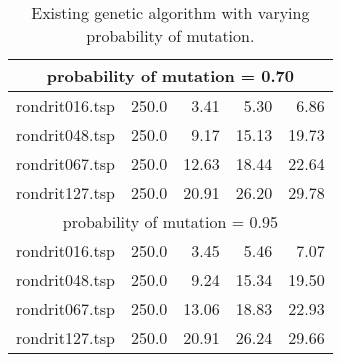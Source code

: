 \begin{table}[H]
{\begin{tabular}{l rrrr}
\multicolumn{5}{c}{probability of mutation = 0.70}\\ 
\midrule
rondrit016.tsp & 250.0 & 3.41 & 5.30 & 6.86 \\
rondrit048.tsp & 250.0 & 9.17 & 15.13 & 19.73 \\
rondrit067.tsp & 250.0 & 12.63 & 18.44 & 22.64 \\
rondrit127.tsp & 250.0 & 20.91 & 26.20 & 29.78 \\
\midrule
\multicolumn{5}{c}{probability of mutation = 0.95}\\ 
\midrule
rondrit016.tsp & 250.0 & 3.45 & 5.46 & 7.07 \\
rondrit048.tsp & 250.0 & 9.24 & 15.34 & 19.50 \\
rondrit067.tsp & 250.0 & 13.06 & 18.83 & 22.93 \\
rondrit127.tsp & 250.0 & 20.91 & 26.24 & 29.66 \\
\bottomrule 
\end{tabular} 
}
\caption{Existing genetic algorithm with varying probability of mutation.}
\label{tab:vary_mutation}
\end{table}
